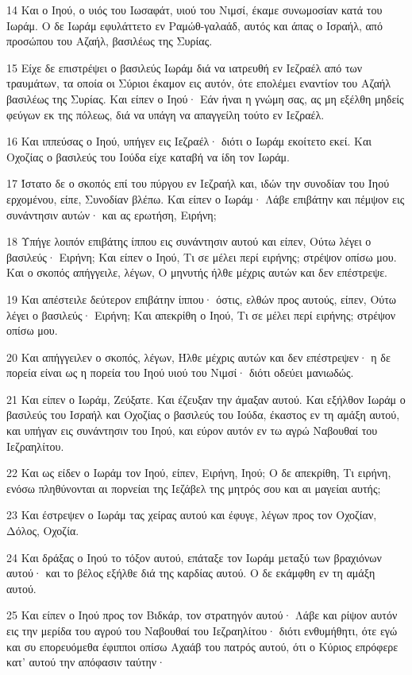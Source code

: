 \par 14 Και ο Ιηού, ο υιός του Ιωσαφάτ, υιού του Νιμσί, έκαμε συνωμοσίαν κατά του Ιωράμ. Ο δε Ιωράμ εφυλάττετο εν Ραμώθ-γαλαάδ, αυτός και άπας ο Ισραήλ, από προσώπου του Αζαήλ, βασιλέως της Συρίας.
\par 15 Είχε δε επιστρέψει ο βασιλεύς Ιωράμ διά να ιατρευθή εν Ιεζραέλ από των τραυμάτων, τα οποία οι Σύριοι έκαμον εις αυτόν, ότε επολέμει εναντίον του Αζαήλ βασιλέως της Συρίας. Και είπεν ο Ιηού· Εάν ήναι η γνώμη σας, ας μη εξέλθη μηδείς φεύγων εκ της πόλεως, διά να υπάγη να απαγγείλη τούτο εν Ιεζραέλ.
\par 16 Και ιππεύσας ο Ιηού, υπήγεν εις Ιεζραέλ· διότι ο Ιωράμ εκοίτετο εκεί. Και Οχοζίας ο βασιλεύς του Ιούδα είχε καταβή να ίδη τον Ιωράμ.
\par 17 Ίστατο δε ο σκοπός επί του πύργου εν Ιεζραήλ και, ιδών την συνοδίαν του Ιηού ερχομένου, είπε, Συνοδίαν βλέπω. Και είπεν ο Ιωράμ· Λάβε επιβάτην και πέμψον εις συνάντησιν αυτών· και ας ερωτήση, Ειρήνη;
\par 18 Υπήγε λοιπόν επιβάτης ίππου εις συνάντησιν αυτού και είπεν, Ούτω λέγει ο βασιλεύς· Ειρήνη; Και είπεν ο Ιηού, Τι σε μέλει περί ειρήνης; στρέψον οπίσω μου. Και ο σκοπός απήγγειλε, λέγων, Ο μηνυτής ήλθε μέχρις αυτών και δεν επέστρεψε.
\par 19 Και απέστειλε δεύτερον επιβάτην ίππου· όστις, ελθών προς αυτούς, είπεν, Ούτω λέγει ο βασιλεύς· Ειρήνη; Και απεκρίθη ο Ιηού, Τι σε μέλει περί ειρήνης; στρέψον οπίσω μου.
\par 20 Και απήγγειλεν ο σκοπός, λέγων, Ήλθε μέχρις αυτών και δεν επέστρεψεν· η δε πορεία είναι ως η πορεία του Ιηού υιού του Νιμσί· διότι οδεύει μανιωδώς.
\par 21 Και είπεν ο Ιωράμ, Ζεύξατε. Και έζευξαν την άμαξαν αυτού. Και εξήλθον Ιωράμ ο βασιλεύς του Ισραήλ και Οχοζίας ο βασιλεύς του Ιούδα, έκαστος εν τη αμάξη αυτού, και υπήγαν εις συνάντησιν του Ιηού, και εύρον αυτόν εν τω αγρώ Ναβουθαί του Ιεζραηλίτου.
\par 22 Και ως είδεν ο Ιωράμ τον Ιηού, είπεν, Ειρήνη, Ιηού; Ο δε απεκρίθη, Τι ειρήνη, ενόσω πληθύνονται αι πορνείαι της Ιεζάβελ της μητρός σου και αι μαγείαι αυτής;
\par 23 Και έστρεψεν ο Ιωράμ τας χείρας αυτού και έφυγε, λέγων προς τον Οχοζίαν, Δόλος, Οχοζία.
\par 24 Και δράξας ο Ιηού το τόξον αυτού, επάταξε τον Ιωράμ μεταξύ των βραχιόνων αυτού· και το βέλος εξήλθε διά της καρδίας αυτού. Ο δε εκάμφθη εν τη αμάξη αυτού.
\par 25 Και είπεν ο Ιηού προς τον Βιδκάρ, τον στρατηγόν αυτού· Λάβε και ρίψον αυτόν εις την μερίδα του αγρού του Ναβουθαί του Ιεζραηλίτου· διότι ενθυμήθητι, ότε εγώ και συ επορευόμεθα έφιπποι οπίσω Αχαάβ του πατρός αυτού, ότι ο Κύριος επρόφερε κατ' αυτού την απόφασιν ταύτην·
